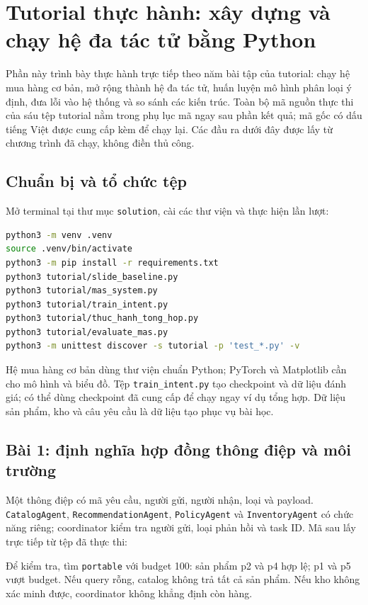 \section{Tutorial thực hành: xây dựng và chạy hệ đa tác tử bằng Python}

Phần này trình bày thực hành trực tiếp theo năm bài tập của tutorial: chạy hệ mua hàng cơ bản, mở rộng thành hệ đa tác tử, huấn luyện mô hình phân loại ý định, đưa lỗi vào hệ thống và so sánh các kiến trúc. Toàn bộ mã nguồn thực thi của sáu tệp tutorial nằm trong phụ lục mã ngay sau phần kết quả; mã gốc có dấu tiếng Việt được cung cấp kèm để chạy lại. Các đầu ra dưới đây được lấy từ chương trình đã chạy, không điền thủ công.

\subsection{Chuẩn bị và tổ chức tệp}
Mở terminal tại thư mục \texttt{solution}, cài các thư viện và thực hiện lần lượt:
\begin{lstlisting}[language=bash]
python3 -m venv .venv
source .venv/bin/activate
python3 -m pip install -r requirements.txt
python3 tutorial/slide_baseline.py
python3 tutorial/mas_system.py
python3 tutorial/train_intent.py
python3 tutorial/thuc_hanh_tong_hop.py
python3 tutorial/evaluate_mas.py
python3 -m unittest discover -s tutorial -p 'test_*.py' -v
\end{lstlisting}

Hệ mua hàng cơ bản dùng thư viện chuẩn Python; PyTorch và Matplotlib cần cho mô hình và biểu đồ. Tệp \texttt{train\_intent.py} tạo checkpoint và dữ liệu đánh giá; có thể dùng checkpoint đã cung cấp để chạy ngay ví dụ tổng hợp. Dữ liệu sản phẩm, kho và câu yêu cầu là dữ liệu tạo phục vụ bài học.

\subsection{Bài 1: định nghĩa hợp đồng thông điệp và môi trường}
Một thông điệp có mã yêu cầu, người gửi, người nhận, loại và payload. \texttt{CatalogAgent}, \texttt{RecommendationAgent}, \texttt{PolicyAgent} và \texttt{InventoryAgent} có chức năng riêng; coordinator kiểm tra người gửi, loại phản hồi và task ID. Mã sau lấy trực tiếp từ tệp đã thực thi:


Để kiểm tra, tìm \texttt{portable} với budget 100: sản phẩm p2 và p4 hợp lệ; p1 và p5 vượt budget. Nếu query rỗng, catalog không trả tất cả sản phẩm. Nếu kho không xác minh được, coordinator không khẳng định còn hàng.


